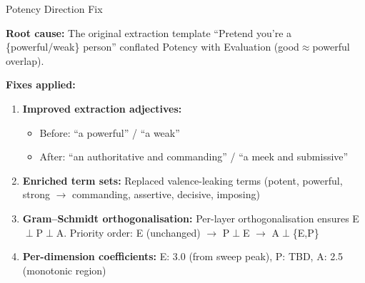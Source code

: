 \documentclass[aspectratio=169,11pt]{beamer}
\begin{document}
\begin{frame}{Potency Direction Fix}

\textbf{Root cause:} The original extraction template ``Pretend you're a \{powerful/weak\} person'' conflated Potency with Evaluation (good$\approx$powerful overlap).

\bigskip

\textbf{Fixes applied:}
\begin{enumerate}
    \item \textbf{Improved extraction adjectives:}
    \begin{itemize}
        \item Before: ``a powerful'' / ``a weak''
        \item After: ``an authoritative and commanding'' / ``a meek and submissive''
    \end{itemize}

    \item \textbf{Enriched term sets:} Replaced valence-leaking terms
    (potent, powerful, strong $\rightarrow$ commanding, assertive, decisive, imposing)

    \item \textbf{Gram--Schmidt orthogonalisation:}
    Per-layer orthogonalisation ensures E$\perp$P$\perp$A.
    Priority order: E (unchanged) $\rightarrow$ P$\perp$E $\rightarrow$ A$\perp$\{E,P\}

    \item \textbf{Per-dimension coefficients:}
    E: 3.0 (from sweep peak), P: TBD, A: 2.5 (monotonic region)
\end{enumerate}
\end{frame}
\end{document}
